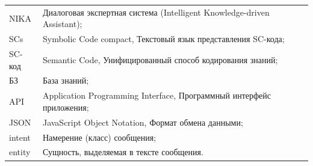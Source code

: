 \label{sec:reduction}

\noindent
\begin{tabular}{@{}p{2.8cm}@{\ \mdash\ }p{11.8cm}@{}}
NIKA & Диалоговая экспертная система (Intelligent Knowledge-driven Assistant);\\
SCs & Symbolic Code compact, Текстовый язык представления SC-кода;\\
SC-код & Semantic Code, Унифицированный способ кодирования знаний;\\
БЗ & База знаний;\\
API & Application Programming Interface, Программный интерфейс приложения;\\
JSON & JavaScript Object Notation, Формат обмена данными;\\
intent & Намерение (класс) сообщения;\\
entity & Сущность, выделяемая в тексте сообщения.
\end{tabular}
